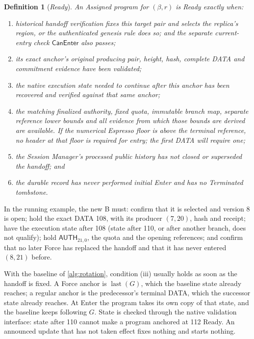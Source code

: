 \documentclass[11pt,a4paper]{article}
\newcommand{\tagg}[1]{\ensuremath{\mathsf{#1}}}
\newcommand{\defterm}[1]{\textcolor{rrBlue}{\textit{#1}}}
\newtheorem{definition}{Definition}[section]
\begin{document}
\begin{definition}[\defterm{Ready}]
\label{def:ready}
An Assigned program for $(\beta,r)$ is \defterm{Ready} exactly when:
\begin{enumerate}[label=(\roman*)]
\item historical handoff verification fixes this target pair and selects
the replica's region, or the authenticated genesis rule does so; and
the separate current-entry check $\tagg{CanEnter}$ also passes;
\item its exact anchor's original producing pair, height, hash, complete
DATA and commitment evidence have been validated;
\item the native execution state needed to continue after this anchor
has been recovered and verified against that same anchor;
\item the matching finalized authority, fixed quota, immutable branch
map, separate reference lower bounds and all evidence from which those
bounds are derived are available. If the numerical Espresso floor is
above the terminal reference, no header at that floor is required for
entry; the first DATA will require one;
\item the Session Manager's processed public history has not closed or
superseded the handoff; and
\item the durable record has never performed initial Enter and has no
Terminated tombstone.
\end{enumerate}
\end{definition}
In the running example, the new B must: confirm that it is selected and
version 8 is open; hold the exact DATA 108, with its producer $(7,20)$,
hash and receipt; have the execution state after 108 (state after 110, or
after another branch, does not qualify); hold $\tagg{AUTH}_{21,0}$, the
quota and the opening references; and confirm that no later Force has
replaced the handoff and that it has never entered $(8,21)$ before.

With the baseline of \cref{alg:rotation}, condition (iii) usually holds
as soon as the handoff is fixed. A Force anchor is
$\operatorname{last}(G)$, which the baseline state already reaches; a
regular anchor is the predecessor's terminal DATA, which the successor
state already reaches. At
Enter the program takes its own copy of that state, and the baseline
keeps following $G$. State is checked through the native validation
interface: state after 110 cannot make a program anchored at 112 Ready.
An announced update that has not taken effect fixes nothing and starts
nothing.
\end{document}
